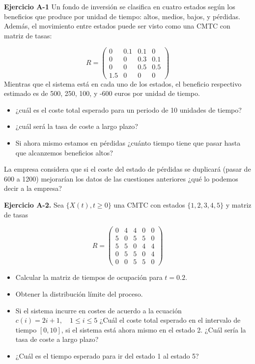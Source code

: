 \documentclass[
]{book}
\providecommand{\tightlist}{%
  \setlength{\itemsep}{0pt}\setlength{\parskip}{0pt}}
\theoremstyle{definition}
\theoremstyle{definition}
\theoremstyle{definition}
\theoremstyle{definition}
\theoremstyle{remark}
\begin{document}
\textbf{Ejercicio A-1} Un fondo de inversión se clasifica en cuatro estados según los beneficios que produce por unidad de tiempo: altos, medios, bajos, y pérdidas. Además, el movimiento entre estados puede ser visto como una CMTC con matriz de tasas:

\[
R = \begin{pmatrix}
0 & 0.1 & 0.1 & 0\\
0 & 0 & 0.3 & 0.1\\
0 & 0 & 0.5 & 0.5\\
1.5 & 0 & 0  & 0 
\end{pmatrix}
\] Mientras que el sistema está en cada uno de los estados, el beneficio respectivo estimado es de 500, 250, 100, y -600 euros por unidad de tiempo.

\begin{itemize}
\tightlist
\item
  ¿cuál es el coste total esperado para un periodo de 10 unidades de tiempo?
\item
  ¿cuál será la tasa de coste a largo plazo?
\item
  Si ahora mismo estamos en pérdidas ¿cuánto tiempo tiene que pasar hasta que alcanzemos beneficios altos?
\end{itemize}

La empresa considera que si el coste del estado de pérdidas se duplicará (pasar de 600 a 1200) mejorarían los datos de las cuestiones anteriores ¿qué lo podemos decir a la empresa?

\textbf{Ejercicio A-2.} Sea \(\{X(t), t \geq 0\}\) una CMTC con estados \(\{1, 2, 3, 4, 5\}\) y matriz de tasas

\[
R = \begin{pmatrix}
0 & 4 & 4 & 0 & 0\\
5 & 0 & 5 & 5 & 0\\
5 & 5 & 0 & 4 & 4\\
0 & 5 & 5  & 0 & 4\\
0 & 0& 5& 5& 0
\end{pmatrix}
\]

\begin{itemize}
\tightlist
\item
  Calcular la matriz de tiempos de ocupación para \(t=0.2\).
\item
  Obtener la distribución límite del proceso.
\item
  Si el sistema incurre en costes de acuerdo a la ecuación \(c(i) = 2i+1, \quad 1\leq i\leq 5\) ¿Cuál el coste total esperado en el intervalo de tiempo \([0, 10]\), si el sistema está ahora mismo en el estado 2. ¿Cuál sería la tasa de coste a largo plazo?
\item
  ¿Cuál es el tiempo esperado para ir del estado 1 al estado 5?
\end{itemize}
\end{document}
